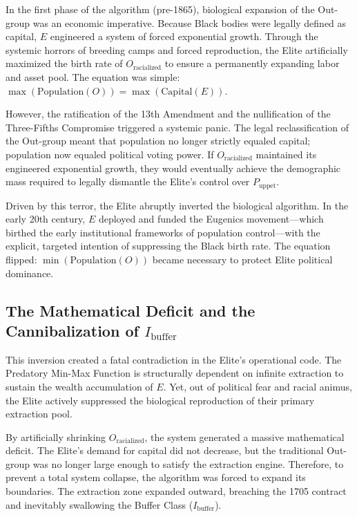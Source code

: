 \documentclass[12pt,openany]{book}
\begin{document}
In the first phase of the algorithm (pre-1865), biological expansion of the Out-group was an economic imperative. Because Black bodies were legally defined as capital, $E$ engineered a system of forced exponential growth. Through the systemic horrors of breeding camps and forced reproduction, the Elite artificially maximized the birth rate of $O_{\text{racialized}}$ to ensure a permanently expanding labor and asset pool. The equation was simple: $\max(\text{Population}(O)) = \max(\text{Capital}(E))$.

However, the ratification of the 13th Amendment and the nullification of the Three-Fifths Compromise triggered a systemic panic. The legal reclassification of the Out-group meant that population no longer strictly equaled capital; population now equaled political voting power. If $O_{\text{racialized}}$ maintained its engineered exponential growth, they would eventually achieve the demographic mass required to legally dismantle the Elite's control over $P_{\text{uppet}}$.

Driven by this terror, the Elite abruptly inverted the biological algorithm. In the early 20th century, $E$ deployed and funded the Eugenics movement---which birthed the early institutional frameworks of population control---with the explicit, targeted intention of suppressing the Black birth rate. The equation flipped: $\min(\text{Population}(O))$ became necessary to protect Elite political dominance.

\subsection{The Mathematical Deficit and the Cannibalization of \texorpdfstring{$I_{\text{buffer}}$}{I\_buffer}}

This inversion created a fatal contradiction in the Elite's operational code. The Predatory Min-Max Function is structurally dependent on infinite extraction to sustain the wealth accumulation of $E$. Yet, out of political fear and racial animus, the Elite actively suppressed the biological reproduction of their primary extraction pool.

By artificially shrinking $O_{\text{racialized}}$, the system generated a massive mathematical deficit. The Elite's demand for capital did not decrease, but the traditional Out-group was no longer large enough to satisfy the extraction engine. Therefore, to prevent a total system collapse, the algorithm was forced to expand its boundaries. The extraction zone expanded outward, breaching the 1705 contract and inevitably swallowing the Buffer Class ($I_{\text{buffer}}$).
\end{document}
